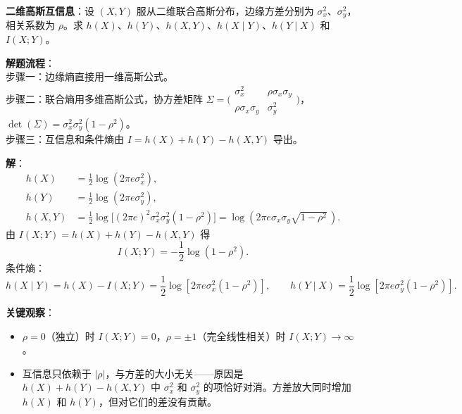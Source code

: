 \begin{example}
\label{ex:gauss-mi}
\textbf{二维高斯互信息}：设 $(X,Y)$ 服从二维联合高斯分布，边缘方差分别为 $\sigma_x^2$、$\sigma_y^2$，相关系数为 $\rho$。求 $h(X)$、$h(Y)$、$h(X,Y)$、$h(X\mid Y)$、$h(Y\mid X)$ 和 $I(X;Y)$。

\noindent \textbf{解题流程}：\\[2pt]
步骤一：边缘熵直接用一维高斯公式。\\
步骤二：联合熵用多维高斯公式，协方差矩阵 $\Sigma=\bigl(\begin{smallmatrix}\sigma_x^2&\rho\sigma_x\sigma_y\\\rho\sigma_x\sigma_y&\sigma_y^2\end{smallmatrix}\bigr)$，$\det(\Sigma)=\sigma_x^2\sigma_y^2(1-\rho^2)$。\\
步骤三：互信息和条件熵由 $I=h(X)+h(Y)-h(X,Y)$ 导出。

\noindent \textbf{解}：\\[2pt]
\begin{align*}
h(X)  &= \frac{1}{2}\log(2\pi e\sigma_x^2),\\
h(Y)  &= \frac{1}{2}\log(2\pi e\sigma_y^2),\\
h(X,Y) &= \frac{1}{2}\log\bigl[(2\pi e)^2\sigma_x^2\sigma_y^2(1-\rho^2)\bigr]
        = \log(2\pi e\sigma_x\sigma_y\sqrt{1-\rho^2}\,).
\end{align*}
由 $I(X;Y)=h(X)+h(Y)-h(X,Y)$ 得
\[
\boxed{I(X;Y)=-\frac{1}{2}\log(1-\rho^2)}.
\]
条件熵：
\[
h(X\mid Y)=h(X)-I(X;Y)=\frac{1}{2}\log[2\pi e\sigma_x^2(1-\rho^2)],
\qquad
h(Y\mid X)=\frac{1}{2}\log[2\pi e\sigma_y^2(1-\rho^2)].
\]

\noindent \textbf{关键观察}：
\begin{itemize}
  \item $\rho=0$（独立）时 $I(X;Y)=0$，$\rho=\pm1$（完全线性相关）时 $I(X;Y)\to\infty$。
  \item 互信息只依赖于 $|\rho|$，与方差的大小无关——原因是 $h(X)+h(Y)-h(X,Y)$ 中 $\sigma_x^2$ 和 $\sigma_y^2$ 的项恰好对消。方差放大同时增加 $h(X)$ 和 $h(Y)$，但对它们的差没有贡献。
\end{itemize}
\end{example}

